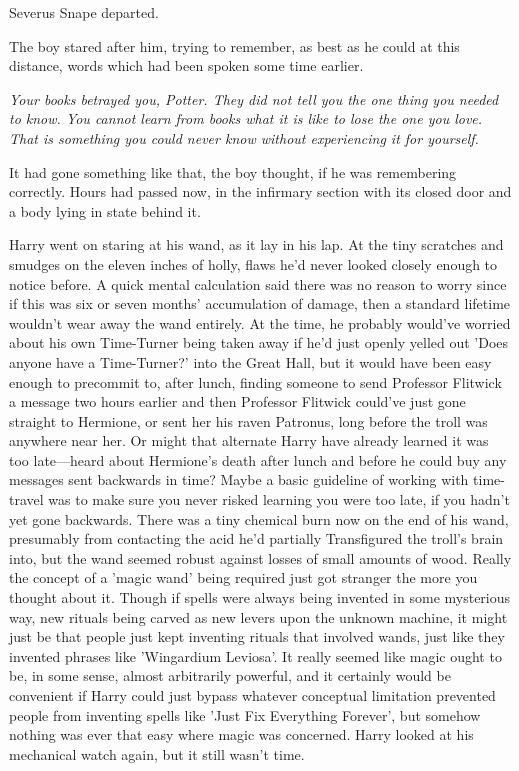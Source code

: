 Severus Snape departed.

The boy stared after him, trying to remember, as best as he could at this 
distance, words which had been spoken some time earlier.

\emph{Your books betrayed you, Potter. They did not tell you the one thing you 
needed to know. You cannot learn from books what it is like to lose the one you 
love. That is something you could never know without experiencing it for 
yourself.}

It had gone something like that, the boy thought, if he was remembering 
correctly.
\sbreak
Hours had passed now, in the infirmary section with its closed door and a body 
lying in state behind it.

Harry went on staring at his wand, as it lay in his lap. At the tiny scratches 
and smudges on the eleven inches of holly, flaws he'd never looked closely 
enough to notice before. A quick mental calculation said there was no reason to 
worry since if this was six or seven months' accumulation of damage, then a 
standard lifetime wouldn't wear away the wand entirely. At the time, he 
probably would've worried about his own Time-Turner being taken away if he'd 
just openly yelled out 'Does anyone have a Time-Turner?' into the Great Hall, 
but it would have been easy enough to precommit to, after lunch, finding 
someone to send Professor Flitwick a message two hours earlier and then 
Professor Flitwick could've just gone straight to Hermione, or sent her his 
raven Patronus, long before the troll was anywhere near her. Or might that 
alternate Harry have already learned it was too late---heard about Hermione's 
death after lunch and before he could buy any messages sent backwards in time? 
Maybe a basic guideline of working with time-travel was to make sure you never 
risked learning you were too late, if you hadn't yet gone backwards. There was 
a tiny chemical burn now on the end of his wand, presumably from contacting the 
acid he'd partially Transfigured the troll's brain into, but the wand seemed 
robust against losses of small amounts of wood. Really the concept of a 'magic 
wand' being required just got stranger the more you thought about it. Though if 
spells were always being invented in some mysterious way, new rituals being 
carved as new levers upon the unknown machine, it might just be that people 
just kept inventing rituals that involved wands, just like they invented 
phrases like 'Wingardium Leviosa'. It really seemed like magic ought to be, in 
some sense, almost arbitrarily powerful, and it certainly would be convenient 
if Harry could just bypass whatever conceptual limitation prevented people from 
inventing spells like 'Just Fix Everything Forever', but somehow nothing was 
ever that easy where magic was concerned. Harry looked at his mechanical watch 
again, but it still wasn't time.

